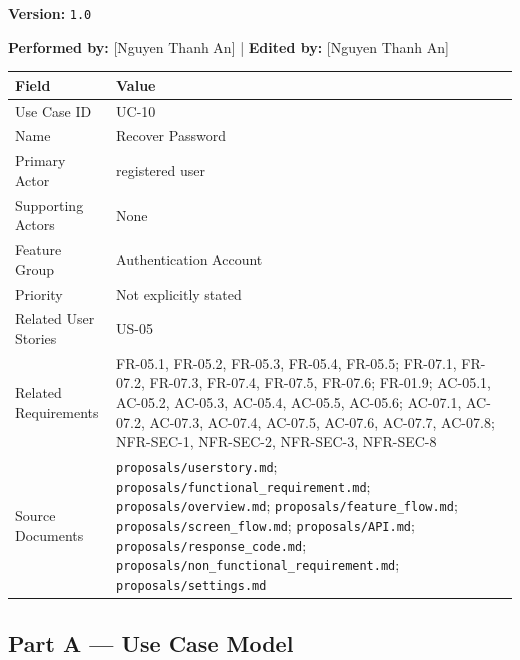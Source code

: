 \documentclass[12pt]{article}
\renewcommand{\baselinestretch}{1.5}
\begin{document}
\textbf{Version:} \texttt{1.0}
\par\medskip

\textbf{Performed by:} [Nguyen Thanh An] | \textbf{Edited by:} [Nguyen Thanh An]
\par\medskip

\begingroup
\small
\renewcommand{\baselinestretch}{1.0}\selectfont
\renewcommand{\arraystretch}{1.15}
\setlength{\tabcolsep}{6pt}
\begin{longtable}{|>{\raggedright\arraybackslash}p{}|>{\raggedright\arraybackslash}p{}|}
\hline
\textbf{Field} & \textbf{Value} \\ \hline
\endhead
Use Case ID & UC-10 \\ \hline
Name & Recover Password \\ \hline
Primary Actor & registered user \\ \hline
Supporting Actors & None \\ \hline
Feature Group & Authentication Account \\ \hline
Priority & Not explicitly stated \\ \hline
Related User Stories & US-05 \\ \hline
Related Requirements & FR-05.1, FR-05.2, FR-05.3, FR-05.4, FR-05.5; FR-07.1, FR-07.2, FR-07.3, FR-07.4, FR-07.5, FR-07.6; FR-01.9; AC-05.1, AC-05.2, AC-05.3, AC-05.4, AC-05.5, AC-05.6; AC-07.1, AC-07.2, AC-07.3, AC-07.4, AC-07.5, AC-07.6, AC-07.7, AC-07.8; NFR-SEC-1, NFR-SEC-2, NFR-SEC-3, NFR-SEC-8 \\ \hline
Source Documents & \texttt{proposals/userstory.md}; \texttt{proposals/functional\_requirement.md}; \texttt{proposals/overview.md}; \texttt{proposals/feature\_flow.md}; \texttt{proposals/screen\_flow.md}; \texttt{proposals/API.md}; \texttt{proposals/response\_code.md}; \texttt{proposals/non\_functional\_requirement.md}; \texttt{proposals/settings.md} \\ \hline
\end{longtable}
\endgroup
\par\medskip

\hypertarget{sec:part-a-use-case-model}{}
\subsection*{Part A --- Use Case Model}
\par\medskip

\hypertarget{sec:a1-focused-use-case-diagram}{}
\end{document}
